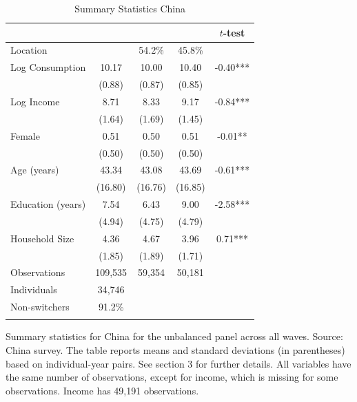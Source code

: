 \begin{table}[htbp] \centering \caption{Summary Statistics China}\label{tab:summary_stats_CHN_unb_2waves} \begin{threeparttable} \begin{tabular}{l cccc} \toprule
 &  &  &  & $t$-test \\
\midrule
Location &  &   54.2\% &   45.8\% &  \\  \addlinespace \addlinespace
Log Consumption & 10.17 & 10.00 & 10.40 & -0.40*** \\
 & (0.88) & (0.87) & (0.85) &  \\  \addlinespace
Log Income & 8.71 & 8.33 & 9.17 & -0.84*** \\
 & (1.64) & (1.69) & (1.45) &  \\  \addlinespace
Female & 0.51 & 0.50 & 0.51 & -0.01** \\
 & (0.50) & (0.50) & (0.50) &  \\  \addlinespace
Age (years) & 43.34 & 43.08 & 43.69 & -0.61*** \\
 & (16.80) & (16.76) & (16.85) &  \\  \addlinespace
Education (years) & 7.54 & 6.43 & 9.00 & -2.58*** \\
 & (4.94) & (4.75) & (4.79) &  \\  \addlinespace
Household Size & 4.36 & 4.67 & 3.96 & 0.71*** \\
 & (1.85) & (1.89) & (1.71) &  \\  \addlinespace


\cmidrule{2-5}
Observations & 109,535 & 59,354 & 50,181 &  \\  \addlinespace
Individuals & 34,746 &  &  &  \\
Non-switchers &   91.2\% &  &  &  \\  \addlinespace
\bottomrule \end{tabular} \begin{tablenotes}[flushleft] \footnotesize \item{Summary statistics for China for the unbalanced panel across all waves. Source: China survey. The table reports means and standard deviations (in parentheses) based on individual-year pairs. See section 3 for further details. All variables have the same number of observations, except for income, which is missing for some observations. Income has 49,191 observations.} \end{tablenotes} \end{threeparttable} \end{table}